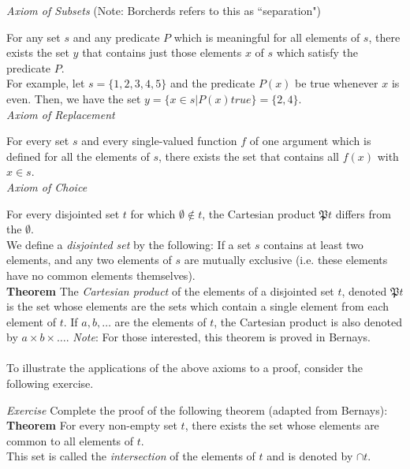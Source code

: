 \textit{Axiom of Subsets}  (Note: Borcherds refers to this as ``separation")

For any set $s$ and any predicate $P$ which is meaningful for all elements of $s$, there exists the set $y$ that contains just those elements $x$ of $s$ which satisfy the predicate $P$. \\

For example, let $s=\{1,2,3,4,5\}$ and the predicate $P\left(x\right)$ be true whenever $x$ is even.  Then, we have the set $y = \{x \in s | P (x) \textit{true} \} = \{2,4\}$.\\

\textit{Axiom of Replacement}

For every set $s$ and every single-valued function $f$ of one argument which is defined for all the elements of $s$, there exists the set that contains all $f(x)$ with $x \in s$.\\

\textit{Axiom of Choice}

For every disjointed set $t$ for which $\emptyset \notin t$, the Cartesian product $\mathfrak{P}t$ differs from the $\emptyset.$\\

We define a \textit{disjointed set} by the following:  If a set $s$ contains at least two elements, and any two elements of $s$ are mutually exclusive (i.e. these elements have no common elements themselves).\\  

\textbf{Theorem} The \textit{Cartesian product} of the elements of a disjointed set $t$, denoted $\mathfrak{P}t$ is the set whose elements are the sets which contain a single element from each element of $t$.  If $a,b, \ldots$ are the elements of $t$, the Cartesian product is also denoted by $a \times b \times \ldots$.  \textit{Note}: For those interested, this theorem is proved in Bernays. \\\\


To illustrate the applications of the above axioms to a proof, consider the following exercise.

\textit{Exercise}  Complete the proof of the following theorem (adapted from Bernays):\\

\textbf{Theorem} For every non-empty set $t$, there exists the set whose elements are common to all elements of $t$.\\
This set is called the \textit{intersection} of the elements of $t$ and is denoted by $\cap t.$\\

